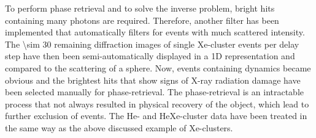 To perform phase retrieval and to solve the inverse problem, bright hits containing many photons are required. Therefore, another filter has been implemented that automatically filters for events with much scattered intensity. The \num{\sim 30} remaining diffraction images of single Xe-cluster events per delay step have then been semi-automatically displayed in a 1D representation and compared to the scattering of a sphere. Now, events containing dynamics became obvious and the brightest hits that show signs of X-ray radiation damage have been selected manually for phase-retrieval. The phase-retrieval is an intractable process that not always resulted in physical recovery of the object, which lead to further exclusion of events. The He- and HeXe-cluster data have been treated in the same way as the above discussed example of Xe-clusters.
